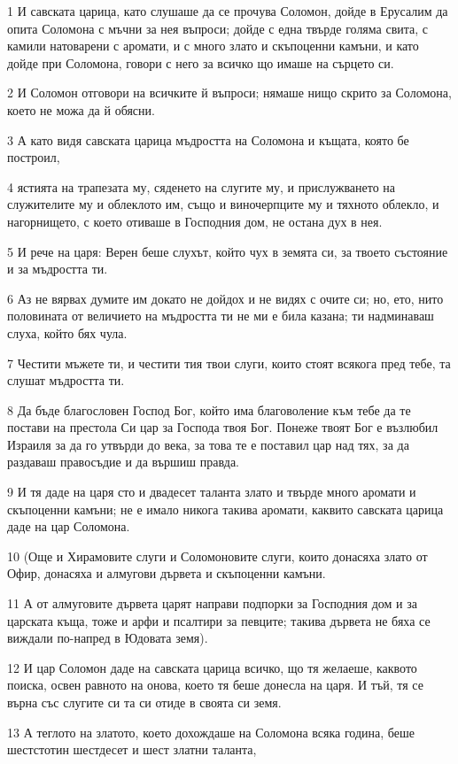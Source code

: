\par 1 И савската царица, като слушаше да се прочува Соломон, дойде в Ерусалим да опита Соломона с мъчни за нея въпроси; дойде с една твърде голяма свита, с камили натоварени с аромати, и с много злато и скъпоценни камъни, и като дойде при Соломона, говори с него за всичко що имаше на сърцето си.
\par 2 И Соломон отговори на всичките й въпроси; нямаше нищо скрито за Соломона, което не можа да й обясни.
\par 3 А като видя савската царица мъдростта на Соломона и къщата, която бе построил,
\par 4 ястията на трапезата му, сяденето на слугите му, и прислужването на служителите му и облеклото им, също и виночерпците му и тяхното облекло, и нагорнището, с което отиваше в Господния дом, не остана дух в нея.
\par 5 И рече на царя: Верен беше слухът, който чух в земята си, за твоето състояние и за мъдростта ти.
\par 6 Аз не вярвах думите им докато не дойдох и не видях с очите си; но, ето, нито половината от величието на мъдростта ти не ми е била казана; ти надминаваш слуха, който бях чула.
\par 7 Честити мъжете ти, и честити тия твои слуги, които стоят всякога пред тебе, та слушат мъдростта ти.
\par 8 Да бъде благословен Господ Бог, който има благоволение към тебе да те постави на престола Си цар за Господа твоя Бог. Понеже твоят Бог е възлюбил Израиля за да го утвърди до века, за това те е поставил цар над тях, за да раздаваш правосъдие и да вършиш правда.
\par 9 И тя даде на царя сто и двадесет таланта злато и твърде много аромати и скъпоценни камъни; не е имало никога такива аромати, каквито савската царица даде на цар Соломона.
\par 10 (Още и Хирамовите слуги и Соломоновите слуги, които донасяха злато от Офир, донасяха и алмугови дървета и скъпоценни камъни.
\par 11 А от алмуговите дървета царят направи подпорки за Господния дом и за царската къща, тоже и арфи и псалтири за певците; такива дървета не бяха се виждали по-напред в Юдовата земя).
\par 12 И цар Соломон даде на савската царица всичко, що тя желаеше, каквото поиска, освен равното на онова, което тя беше донесла на царя. И тъй, тя се върна със слугите си та си отиде в своята си земя.
\par 13 А теглото на златото, което дохождаше на Соломона всяка година, беше шестстотин шестдесет и шест златни таланта,
